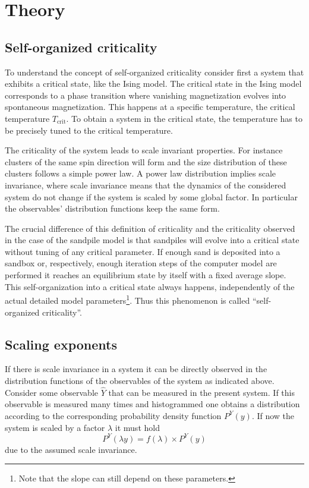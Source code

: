 \section{Theory}
\label{sec:theory}

\subsection{Self-organized criticality}
\label{sec:th:SOC}
To understand the concept of self-organized criticality consider first a system that exhibits a critical state,
like the Ising model. The critical state in the Ising model corresponds to a phase transition where vanishing
magnetization evolves into spontaneous magnetization. This happens at a specific temperature, the critical temperature
$T_{\mathrm{crit}}$. To obtain a system in the critical state, the temperature has to be precisely tuned to the critical
temperature.

The criticality of the system leads to scale invariant properties. For instance clusters of the same spin direction
will form and the size distribution of these clusters follows a simple power law. A power law distribution implies
scale invariance, where scale invariance means that the dynamics of the considered system do not change if the system
is scaled by some global factor. In particular the observables' distribution functions keep the same form.

The crucial difference of this definition of criticality and the criticality observed in the case of the sandpile model
is that sandpiles will evolve into a critical state without tuning of any critical parameter.
If enough sand is deposited into a sandbox or, respectively, enough iteration steps of the computer model are performed
it reaches an equilibrium state by itself with a fixed average slope. This self-organization into a critical state
always happens, independently of the actual detailed model parameters\footnote{Note that the slope can still depend
on these parameters.}. Thus this phenomenon is called \enquote{self-organized criticality}.

\subsection{Scaling exponents}
\label{sec:th:scaling}
If there is scale invariance in a system it can be directly observed in the distribution functions
of the observables of the system as indicated above. Consider some observable $\hat{Y}$ that can be measured in the
present system. If this observable is measured many times and histogrammed one obtains a distribution according to the
corresponding probability density function $P^{Y}(y)$.
If now the system is scaled by a factor $\lambda$ it must hold
\begin{equation}\label{eq:scalingCondition}
P^{Y}(\lambda y) = f(\lambda) \times P^{Y}(y)
\end{equation}
due to the assumed scale invariance.

